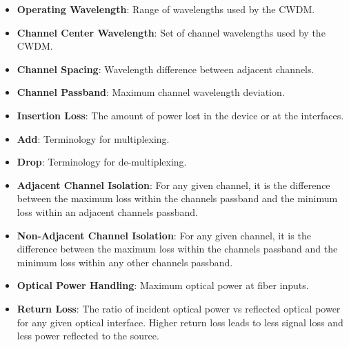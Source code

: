 \begin{itemize}
	\item \textbf{Operating Wavelength}: Range of wavelengths used by the CWDM.
	\item \textbf{Channel Center Wavelength}: Set of channel wavelengths used by the CWDM.
	\item \textbf{Channel Spacing}: Wavelength difference between adjacent channels.
	\item \textbf{Channel Passband}: Maximum channel wavelength deviation.
	\item \textbf{Insertion Loss}: The amount of power lost in the device or at the interfaces.
	\item \textbf{Add}: Terminology for multiplexing\cite{noauthor_glossary_2015}.
	\item \textbf{Drop}: Terminology for de-multiplexing\cite{noauthor_glossary_2015}.
	\item \textbf{Adjacent Channel Isolation}: For any given channel, it is the difference between the maximum loss within the channels passband and the minimum loss within an adjacent channels passband\cite{noauthor_glossary_2015}.
	\item \textbf{Non-Adjacent Channel Isolation}: For any given channel, it is the difference between the maximum loss within the channels passband and the minimum loss within any other channels passband\cite{noauthor_glossary_2015}.
	\item \textbf{Optical Power Handling}: Maximum optical power at fiber inputs.
	\item \textbf{Return Loss}: The ratio of incident optical power vs reflected optical power for any given optical interface. Higher return loss leads to less signal loss and less power reflected to the source\cite{noauthor_glossary_2015}.
\end{itemize}


